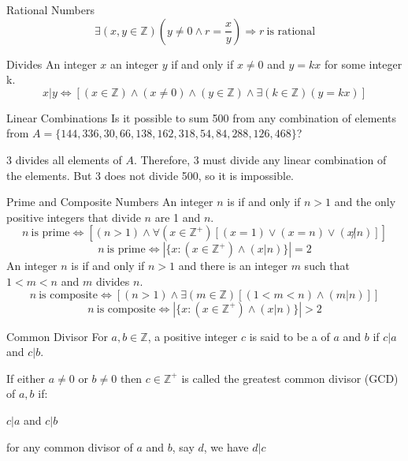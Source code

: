 \documentclass[12pt]{report}
\begin{document}
\begin{dfnbox}{Rational Numbers}
	$$ \exists (x, y \in \mathbb{Z}) \left( y \neq 0 \land r=\frac{x}{y} \right) \Rightarrow r\ \text{is rational}$$
\end{dfnbox}

\begin{dfnbox}{Divides}
	An integer $x$  an integer $y$ if and only if $x \neq 0$ and $y = kx$ for some integer k.
	$$ x | y \iff \left[ (x \in \mathbb{Z}) \land (x \neq 0) \land (y \in \mathbb{Z}) \land \exists (k \in \mathbb{Z}) (y = kx) \right]$$

	\begin{exbox}{Linear Combinations}
		Is it possible to sum 500 from any combination of elements from $A=\{144, 336, 30, 66, 138, 162, 318, 54, 84, 288, 126, 468\}$?

		3 divides all elements of $A$. Therefore, 3 must divide any linear combination of the elements. But 3 does not divide 500, so it is impossible.
	\end{exbox}
\end{dfnbox}

\begin{dfnbox}{Prime and Composite Numbers}
	An integer $n$ is  if and only if $n>1$ and the only positive integers that divide $n$ are 1 and $n$.
	$$n\ \text{is prime} \iff \left[ (n>1) \land \forall (x \in \mathbb{Z}^+) \left[ (x = 1) \lor (x = n) \lor (x \not | n)\right] \right]$$
	$$n\ \text{is prime} \iff \left| \{ x : (x \in \mathbb{Z}^+) \land (x | n) \} \right| = 2$$
	An integer $n$ is  if and only if $n>1$ and there is an integer $m$ such that $1<m<n$ and $m$ divides $n$.
	$$n\ \text{is composite} \iff \left[ (n>1) \land \exists (m \in \mathbb{Z}) \left[ (1<m<n) \land (m | n) \right] \right]$$
	$$n\ \text{is composite} \iff \left| \{x : (x \in \mathbb{Z}^+) \land (x | n) \} \right| > 2$$
\end{dfnbox}

\begin{dfnbox}{Common Divisor}
	For $a, b \in \mathbb{Z}$, a positive integer $c$ is said to be a  of $a$ and $b$ if $c|a$ and $c|b$.

	If either $a \neq 0$ or $b \neq 0$ then $c \in \mathbb{Z}^+$ is called the greatest common divisor (GCD) of $a,b$ if:
	\begin{dfnitems}
		\item $c|a$ and $c|b$
		\item for any common divisor of $a$ and $b$, say $d$, we have $d|c$
	\end{dfnitems}

\end{dfnbox}
\end{document}
